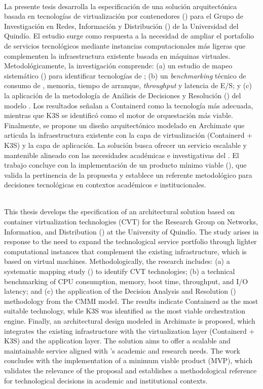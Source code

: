 \label{cap:resumen}
\mbox{}\\
La presente tesis desarrolla la especificación de una solución arquitectónica basada en tecnologías de virtualización por contenedores (\VBC) para el Grupo de Investigación en Redes, Información y Distribución (\GRID) de la Universidad del Quindío. El estudio surge como respuesta a la necesidad de ampliar el portafolio de servicios tecnológicos mediante instancias computacionales más ligeras que complementen la infraestructura existente basada en máquinas virtuales. 
Metodológicamente, la investigación comprende: (a) un estudio de mapeo sistemático (\SMS) para identificar tecnologías de \VBC; (b) un \textit{benchmarking} técnico de consumo de \CPU, memoria, tiempo de arranque, \textit{throughput} y latencia de E/S; y (c) la aplicación de la metodología de Análisis de Decisiones y Resolución (\DAR) del modelo \CMMI. Los resultados señalan a Containerd como la tecnología más adecuada, mientras que K3S se identificó como el motor de orquestación más viable. 
Finalmente, se propone un diseño arquitectónico modelado en Archimate que articula la infraestructura existente con la capa de virtualización (Containerd + K3S) y la capa de aplicación. La solución busca ofrecer un servicio escalable y mantenible alineado con las necesidades académicas e investigativas del \GRID. El trabajo concluye con la implementación de un producto mínimo viable (\PMV), que valida la pertinencia de la propuesta y establece un referente metodológico para decisiones tecnológicas en contextos académicos e institucionales. 

\label{cap:abstract}
\mbox{}\\
This thesis develops the specification of an architectural solution based on container virtualization technologies (CVT) for the Research Group on Networks, Information, and Distribution (\GRID) at the University of Quindío. The study arises in response to the need to expand the technological service portfolio through lighter computational instances that complement the existing infrastructure, which is based on virtual machines.
Methodologically, the research includes: (a) a systematic mapping study (\SMS) to identify CVT technologies; (b) a technical benchmarking of CPU consumption, memory, boot time, throughput, and I/O latency; and (c) the application of the Decision Analysis and Resolution (\DAR) methodology from the CMMI model. The results indicate Containerd as the most suitable technology, while K3S was identified as the most viable orchestration engine.
Finally, an architectural design modeled in Archimate is proposed, which integrates the existing infrastructure with the virtualization layer (Containerd + K3S) and the application layer. The solution aims to offer a scalable and maintainable service aligned with \GRID’s academic and research needs. The work concludes with the implementation of a minimum viable product (MVP), which validates the relevance of the proposal and establishes a methodological reference for technological decisions in academic and institutional contexts.